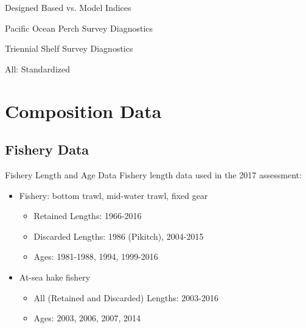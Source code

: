 \documentclass[pdf]{beamer}\usepackage[]{graphicx}\usepackage[]{color}
\begin{document}
\begin{frame}{Designed Based vs. Model Indices}
  \begin{center}
  \end{center}
\end{frame}

\begin{frame}{Pacific Ocean Perch Survey Diagnostics}
  \begin{center}
  \end{center}
\end{frame}

\begin{frame}{Triennial Shelf Survey Diagnostics}
  \begin{center}
  \end{center}
\end{frame}


\begin{frame}{All: Standardized}
  \begin{center}
  \end{center}
\end{frame}


\section{Composition Data}
\subsection{Fishery Data}
\begin{frame}{Fishery Length and Age Data}
  Fishery length data used in the 2017 assessment:
  \begin{itemize}
    \item Fishery: bottom trawl, mid-water trawl, fixed gear
      \begin{itemize}
        \item Retained Lengths: 1966-2016
        \item Discarded Lengths: 1986 (Pikitch), 2004-2015
        \item Ages: 1981-1988, 1994, 1999-2016
      \end{itemize}
    \item At-sea hake fishery
      \begin{itemize}
        \item All (Retained and Discarded) Lengths: 2003-2016
        \item Ages: 2003, 2006, 2007, 2014
      \end{itemize}
  \end{itemize}
\end{frame}
\end{document}
